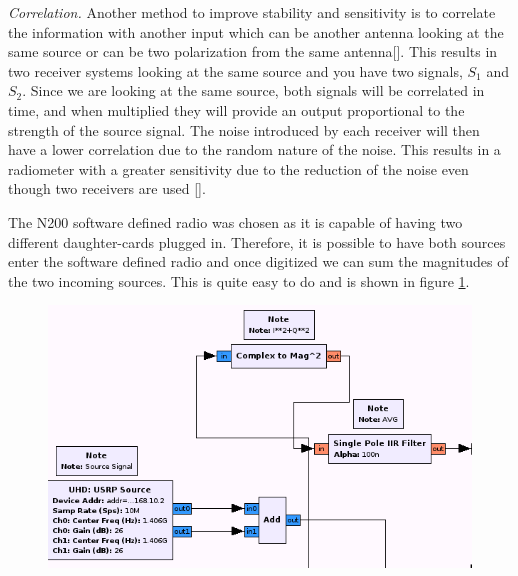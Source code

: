 
 
\emph{Correlation.}  Another method to improve stability and sensitivity is to correlate the information with another input which can be another antenna looking at the same source or can be two polarization from the same antenna[\cite{Clapp}].  This results in two receiver systems looking at the same source and you have two signals, $S_1$ and $S_2$.  Since we are looking at the same source, both signals will be correlated in time, and when multiplied they will provide an output proportional to the strength of the source signal.  The noise introduced by each receiver will then have a lower correlation due to the random nature of the noise.  This results in a radiometer with a greater sensitivity due to the reduction of the noise even though two receivers are used [\cite{Fujimoto}].

The N200 software defined radio was chosen as it is capable of having two different daughter-cards plugged in.  Therefore, it is possible to have both sources enter the software defined radio and once digitized we can sum the magnitudes of the two incoming sources.  This is quite easy to do and is shown in figure \ref{correlating_sdr}.

{\begin{figure}[h!tb] 
\centering
\includegraphics[width=14cm]{Images/N200_rad_corr.png}
\label{correlating_sdr}
\end{figure}
}

